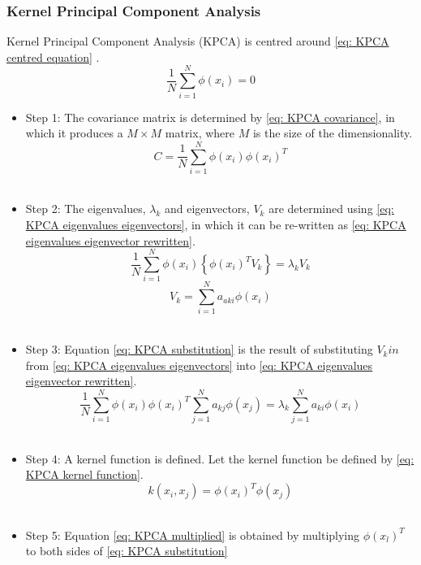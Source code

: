 \documentclass[11pt]{article}
\begin{document}
	\subsubsection{Kernel Principal Component Analysis}
	Kernel Principal Component Analysis (KPCA) is centred around \eqref{eq: KPCA centred equation} \cite{Ibrahim_Baharudin2016}.
	\begin{equation}
		\label{eq: KPCA centred equation}
		\frac{1}{N}\sum_{i=1}^{N}\phi(x_i)=0
	\end{equation}
	\begin{itemize}
		\item Step 1: The covariance matrix is determined by \eqref{eq: KPCA covariance}, in which it produces a $M \times M$ matrix, where $M$ is the size of the dimensionality.
		\begin{equation}
			\label{eq: KPCA covariance}
			C = \frac{1}{N}\sum_{i=1}^{N}\phi(x_i)\phi(x_i)^T
		\end{equation} \\
		\item Step 2: The eigenvalues, $\lambda_k$ and eigenvectors, $V_k$ are determined using \eqref{eq: KPCA eigenvalues eigenvectors}, in which it can be re-written as \eqref{eq: KPCA eigenvalues eigenvector rewritten}.
		\begin{equation}
			\label{eq: KPCA eigenvalues eigenvectors}
			\frac{1}{N}\sum_{i=1}^{N}\phi(x_i)\left\{\phi(x_i)^TV_k\right\} = \lambda_k V_k
		\end{equation} 
		\begin{equation}
			\label{eq: KPCA eigenvalues eigenvector rewritten}
			V_k = \sum_{i=1}^{N}a_{aki}\phi(x_i)
		\end{equation} \\
		\item Step 3: Equation \eqref{eq: KPCA substitution} is the result of substituting $V_kin$ from \eqref{eq: KPCA eigenvalues eigenvectors} into \eqref{eq: KPCA eigenvalues eigenvector rewritten}.
		\begin{equation}
			\label{eq: KPCA substitution}
			\frac{1}{N}\sum_{i=1}^{N}\phi(x_i)\phi(x_i)^T \sum_{j=1}^{N}a_{kj}\phi(x_j) = \lambda_{k}\sum_{j=1}^{N}a_{ki}\phi(x_i)
		\end{equation} \\
		\item Step 4: A kernel function is defined. Let the kernel function be defined by \eqref{eq: KPCA kernel function}.
		\begin{equation}
			\label{eq: KPCA kernel function}
			k(x_i, x_j) = \phi(x_i)^T\phi(x_j)
		\end{equation}\\
		\item Step 5: Equation \eqref{eq: KPCA multiplied} is obtained by multiplying $\phi(x_l)^T$ to both sides of \eqref{eq: KPCA substitution}
	\end{itemize}
\end{document}
